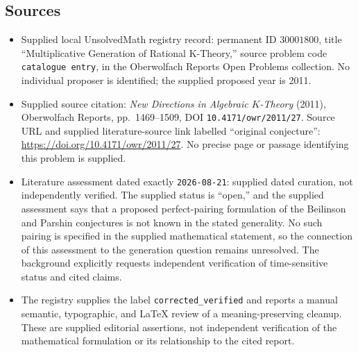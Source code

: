 \documentclass[11pt]{article}
\begin{document}
\subsection{Sources}
\begin{itemize}
\item Supplied local UnsolvedMath registry record: permanent ID \(30001800\), title ``Multiplicative Generation of Rational K-Theory,'' source problem code \texttt{catalogue entry}, in the Oberwolfach Reports Open Problems collection. No individual proposer is identified; the supplied proposed year is 2011.
\item Supplied source citation: \emph{New Directions in Algebraic \(K\)-Theory} (2011), Oberwolfach Reports, pp.\ 1469--1509, DOI \texttt{10.4171/owr/2011/27}. Source URL and supplied literature-source link labelled ``original conjecture'': \url{https://doi.org/10.4171/owr/2011/27}. No precise page or passage identifying this problem is supplied.
\item Literature assessment dated exactly \texttt{2026-08-21}: supplied dated curation, not independently verified. The supplied status is ``open,'' and the supplied assessment says that a proposed perfect-pairing formulation of the Beilinson and Parshin conjectures is not known in the stated generality. No such pairing is specified in the supplied mathematical statement, so the connection of this assessment to the generation question remains unresolved. The background explicitly requests independent verification of time-sensitive status and cited claims.
\item The registry supplies the label \texttt{corrected\_verified} and reports a manual semantic, typographic, and LaTeX review of a meaning-preserving cleanup. These are supplied editorial assertions, not independent verification of the mathematical formulation or its relationship to the cited report.
\end{itemize}
\end{document}
